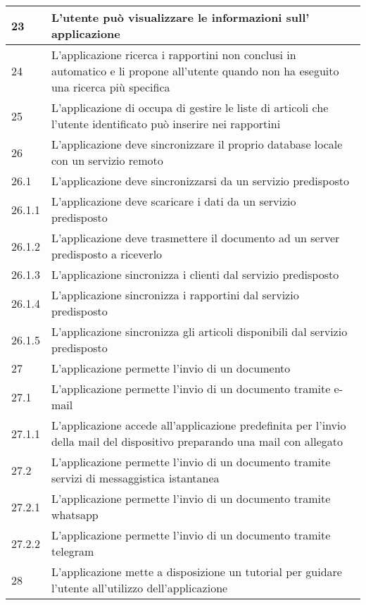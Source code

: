 \begin{longtable}{||p{} p{10.55cm}||}
		\hline
		23 & L’utente può visualizzare le informazioni sull’ applicazione\\
		\hline
		24 & L’applicazione ricerca i rapportini non conclusi in automatico e li propone all’utente quando non ha eseguito una ricerca più specifica\\
		\hline
		25 & L’applicazione di occupa di gestire le liste di articoli che l’utente identificato può inserire nei rapportini\\
		\hline
		26 & L’applicazione deve sincronizzare il proprio database locale con un servizio remoto\\
		26.1 & L’applicazione deve sincronizzarsi da un servizio predisposto\\
		26.1.1 & L’applicazione deve scaricare i dati da un servizio predisposto\\
		26.1.2 & L’applicazione deve trasmettere il documento ad un server predisposto a riceverlo\\
		26.1.3 & L’applicazione sincronizza i clienti dal servizio predisposto \\
		26.1.4 & L’applicazione sincronizza i rapportini dal servizio predisposto\\
		26.1.5 & L’applicazione sincronizza gli articoli disponibili dal servizio predisposto\\
		\hline
		27 & L’applicazione permette l’invio di un documento\\
		27.1 & L’applicazione permette l’invio di un documento tramite e-mail\\
		27.1.1 & L’applicazione accede all’applicazione predefinita per l’invio della mail del dispositivo preparando una mail con allegato\\
		27.2 & L’applicazione permette l’invio di un documento tramite servizi di messaggistica istantanea\\
		27.2.1 & L’applicazione permette l’invio di un documento tramite whatsapp\\
		27.2.2 & L’applicazione permette l’invio di un documento tramite telegram\\
		\hline
		28 & L’applicazione mette a disposizione un tutorial per guidare l’utente all’utilizzo dell’applicazione\\
		\hline
\end{longtable}
